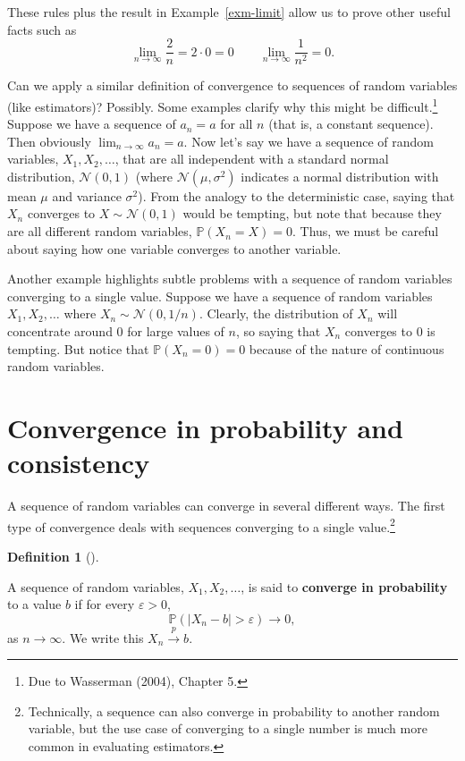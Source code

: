 \documentclass[
  13pt,
  letterpaper,
  DIV=11,
  numbers=noendperiod]{scrreprt}
\newcommand{\N}{\mathcal{N}}
\renewcommand{\P}{\mathbb{P}}
\newcommand{\inprob}{\overset{p}{\to}}
\theoremstyle{plain}
\theoremstyle{plain}
\theoremstyle{definition}
\newtheorem{definition}{Definition}[chapter]
\theoremstyle{definition}
\theoremstyle{remark}
\begin{document}
These rules plus the result in Example~\ref{exm-limit} allow us to prove
other useful facts such as \[
\lim_{n\to\infty} \frac{2}{n} = 2 \cdot 0 = 0 \qquad  \lim_{n\to\infty} \frac{1}{n^{2}} = 0.
\]

Can we apply a similar definition of convergence to sequences of random
variables (like estimators)? Possibly. Some examples clarify why this
might be difficult.\footnote{Due to Wasserman (2004), Chapter 5.}
Suppose we have a sequence of \(a_n = a\) for all \(n\) (that is, a
constant sequence). Then obviously
\(\lim_{n\rightarrow\infty} a_n = a\). Now let's say we have a sequence
of random variables, \(X_1, X_2, \ldots\), that are all independent with
a standard normal distribution, \(\N(0,1)\) (where \(\N(\mu, \sigma^2)\)
indicates a normal distribution with mean \(\mu\) and variance
\(\sigma^2\)). From the analogy to the deterministic case, saying that
\(X_n\) converges to \(X \sim \N(0, 1)\) would be tempting, but note
that because they are all different random variables,
\(\P(X_n = X) = 0\). Thus, we must be careful about saying how one
variable converges to another variable.

Another example highlights subtle problems with a sequence of random
variables converging to a single value. Suppose we have a sequence of
random variables \(X_1, X_2, \ldots\) where \(X_n \sim \N(0, 1/n)\).
Clearly, the distribution of \(X_n\) will concentrate around 0 for large
values of \(n\), so saying that \(X_n\) converges to 0 is tempting. But
notice that \(\P(X_n = 0) = 0\) because of the nature of continuous
random variables.

\section{Convergence in probability and
consistency}\label{convergence-in-probability-and-consistency}

A sequence of random variables can converge in several different ways.
The first type of convergence deals with sequences converging to a
single value.\footnote{Technically, a sequence can also converge in
  probability to another random variable, but the use case of converging
  to a single number is much more common in evaluating estimators.}

\begin{definition}[]\protect\hypertarget{def-inprob}{}\label{def-inprob}

A sequence of random variables, \(X_1, X_2, \ldots\), is said to
\textbf{converge in probability} to a value \(b\) if for every
\(\varepsilon > 0\), \[
\P(|X_n - b| > \varepsilon) \rightarrow 0,
\] as \(n\rightarrow \infty\). We write this \(X_n \inprob b\).

\end{definition}
\end{document}

